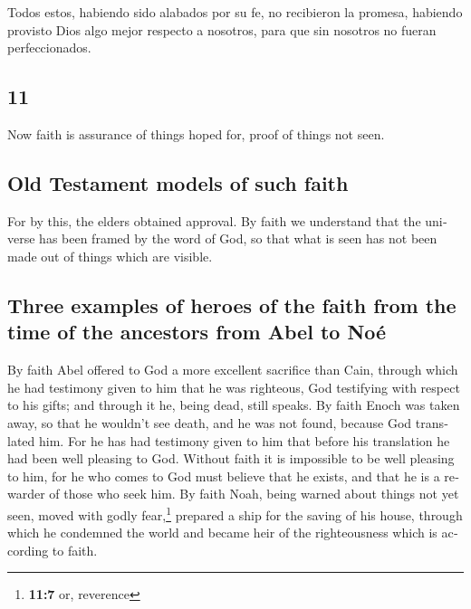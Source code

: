 \begin{paracol}{2}
 Todos estos, habiendo sido alabados por su fe, no
recibieron la promesa,  habiendo provisto Dios algo mejor
respecto a nosotros, para que sin nosotros no fueran perfeccionados.

\switchcolumn
\begin{otherlanguage}{english}

\hypertarget{section-21}{%
\section{11}\label{section-21}}

 Now faith is assurance of things hoped for, proof of
things not seen.

\hypertarget{old-testament-models-of-such-faith}{%
\subsection{Old Testament models of such
faith}\label{old-testament-models-of-such-faith}}

 For by this, the elders obtained approval. 
By faith we understand that the universe has been framed by the word of
God, so that what is seen has not been made out of things which are
visible.

\hypertarget{three-examples-of-heroes-of-the-faith-from-the-time-of-the-ancestors-from-abel-to-nouxe9}{%
\subsection{Three examples of heroes of the faith from the time of the
ancestors from Abel to
Noé}\label{three-examples-of-heroes-of-the-faith-from-the-time-of-the-ancestors-from-abel-to-nouxe9}}

 By faith Abel offered to God a more excellent sacrifice
than Cain, through which he had testimony given to him that he was
righteous, God testifying with respect to his gifts; and through it he,
being dead, still speaks.  By faith Enoch was taken away,
so that he wouldn't see death, and he was not found, because God
translated him. For he has had testimony given to him that before his
translation he had been well pleasing to God.  Without
faith it is impossible to be well pleasing to him, for he who comes to
God must believe that he exists, and that he is a rewarder of those who
seek him.  By faith Noah, being warned about things not
yet seen, moved with godly fear,\footnote{\textbf{11:7} or, reverence}
prepared a ship for the saving of his house, through which he condemned
the world and became heir of the righteousness which is according to
faith.


\end{otherlanguage}
\end{paracol}
